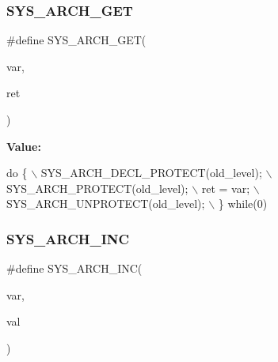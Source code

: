 \subsubsection{\texorpdfstring{S\+Y\+S\+\_\+\+A\+R\+C\+H\+\_\+\+G\+ET}{SYS\_ARCH\_GET}}
{\footnotesize\ttfamily \#define S\+Y\+S\+\_\+\+A\+R\+C\+H\+\_\+\+G\+ET(\begin{DoxyParamCaption}\item[{}]{var,  }\item[{}]{ret }\end{DoxyParamCaption})}

{\bfseries Value\+:}
\begin{DoxyCode}
\textcolor{keywordflow}{do} \{ \(\backslash\)
                                SYS\_ARCH\_DECL\_PROTECT(old\_level); \(\backslash\)
                                SYS\_ARCH\_PROTECT(old\_level); \(\backslash\)
                                ret = var; \(\backslash\)
                                SYS\_ARCH\_UNPROTECT(old\_level); \(\backslash\)
                              \} \textcolor{keywordflow}{while}(0)
\end{DoxyCode}
\mbox{\label{openmote-cc2538_2lwip_2src_2include_2lwip_2sys_8h_acc5f7f8cbd020de628d1e9a0443da4c7}} 
\subsubsection{\texorpdfstring{S\+Y\+S\+\_\+\+A\+R\+C\+H\+\_\+\+I\+NC}{SYS\_ARCH\_INC}}
{\footnotesize\ttfamily \#define S\+Y\+S\+\_\+\+A\+R\+C\+H\+\_\+\+I\+NC(\begin{DoxyParamCaption}\item[{}]{var,  }\item[{}]{val }\end{DoxyParamCaption})}

